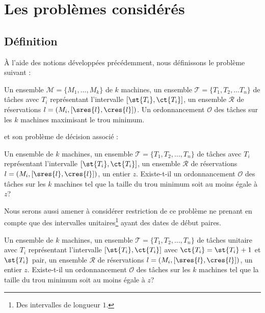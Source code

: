 \section{Les problèmes considérés}

\subsection{Définition}
\label{def_pb}

À l'aide des notions développées précédemment, nous définissons le problème suivant :

\dfopt{\fisched}
{Un ensemble $\mathcal{M} = \{M_1, \dots, M_k\}$ de $k$ machines, un ensemble $\mathcal{T} = \{T_1,
    T_2, \dots T_n\}$ de tâches avec $T_i$ représentant l'intervalle $[\st{T_i}, \ct{T_i}]$, un
ensemble $\mathcal{R}$ de réservations $l = (M_i, [\sres{l}, \cres{l}])$.} 
{Un ordonnancement $\mathcal{O}$ des tâches sur les $k$ machines maximisant le trou
minimum.}

et son problème de décision associé :

\dfdec{\fischedpi{}}
{Un ensemble de $k$ machines, un ensemble $\mathcal{T} = \{T_1, T_2, \dots, T_n\}$ de tâches avec
    $T_i$ représentant l'intervalle $[\st{T_i}, \ct{T_i}]$, un ensemble $\mathcal{R}$ de
réservations $l = (M_i, [\sres{l}, \cres{l}])$, un entier $z$.}
{Existe-t-il un ordonnancement $\mathcal{O}$ des tâches sur les $k$ machines tel que la taille du
trou minimum soit au moins égale à $z$?}

Nous serons aussi amener à considérer restriction de ce problème ne prenant en compte que des
intervalles unitaires\footnote{Des intervalles de longueur $1$.} ayant des dates de début paires.

\dfdec[unitfischedpi]{\unitfischedpi{}}
{Un ensemble de $k$ machines, un ensemble $\mathcal{T} = \{T_1, T_2, \dots, T_n\}$ de tâches
unitaire avec $T_i$ représentant l'intervalle $[\st{T_i}, \ct{T_i}]$ avec $\ct{T_i} = \st{T_i} +
1$ et $\st{T_i}$ pair, un ensemble $\mathcal{R}$ de réservations $l = (M_i, [\sres{l}, \cres{l}])$,
un entier $z$.}
{Existe-t-il un ordonnancement $\mathcal{O}$ des tâches sur les $k$ machines tel que la taille du
trou minimum soit au moins égale à $z$?}


